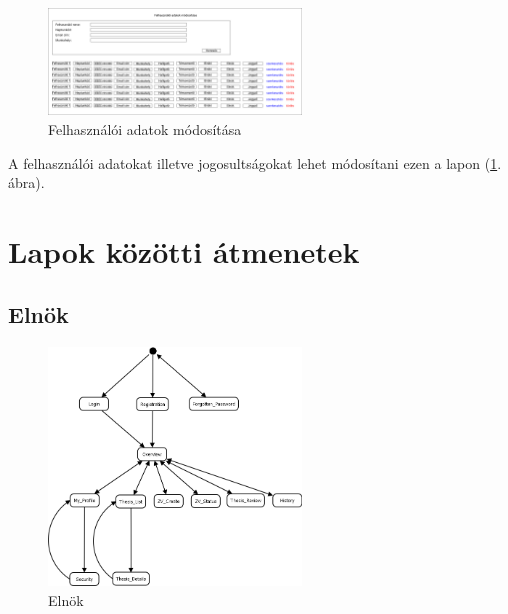 \documentclass[a4paper,12pt]{article}
\begin{document}
\begin{figure}[h!]
	\centering
	\includegraphics[width=0.6\textwidth]{images/Web_pages/User_Modifiactions.png}
	\caption{Felhasználói adatok módosítása}
	\label{fig:User_Modifiactions}
\end{figure}

A felhasználói adatokat illetve jogosultságokat lehet módosítani ezen a lapon (\ref{fig:User_Modifiactions}. ábra).

\section{Lapok közötti átmenetek}

\subsection{Elnök}

\begin{figure}[h!]
	\centering
	\includegraphics[width=0.6\textwidth]{images/Lapok_kozotti_atmenetek/Elnok.png}
	\caption{Elnök}
	\label{fig:Elnok}
\end{figure}
\end{document}
